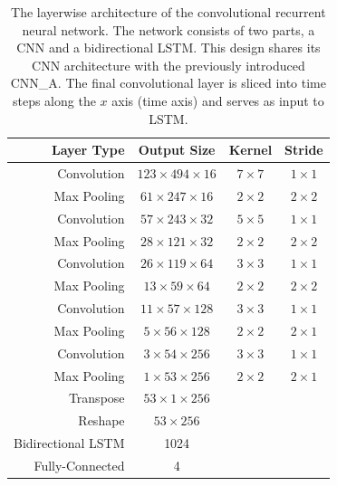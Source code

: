  \begin{table}[tp]
  \centering
  \begin{tabu}{rccc}
  \toprule
\textbf{Layer Type}       & \textbf{Output Size}    & \textbf{Kernel} & \textbf{Stride}  \\ \midrule
Convolution               & $123 \times 494 \times 16$  & $7 \times 7$    & $1 \times 1$    \\
Max Pooling               & $61 \times 247 \times 16$   & $2 \times 2$    & $2 \times 2$    \\
Convolution               & $57 \times 243 \times 32$   & $5 \times 5$    & $1 \times 1$    \\
Max Pooling               & $28 \times 121 \times 32$   & $2 \times 2$    & $2 \times 2$    \\
Convolution               & $26 \times 119 \times 64$   & $3 \times 3$    & $1 \times 1$    \\
Max Pooling               & $13 \times 59 \times 64$    & $2 \times 2$    & $2 \times 2$    \\
Convolution               & $11 \times 57 \times 128$   & $3 \times 3$    & $1 \times 1$    \\
Max Pooling               & $5 \times 56 \times 128$    & $2 \times 2$    & $2 \times 1$    \\
Convolution               & $3 \times 54 \times 256$    & $3 \times 3$    & $1 \times 1$    \\
Max Pooling               & $1 \times 53 \times 256$    & $2 \times 2$    & $2 \times 1$    \\
Transpose                 & $53 \times 1 \times 256$    &        &         \\
Reshape                   & $53 \times 256$           &        &         \\
Bidirectional LSTM & 1024                    &        &         \\
Fully-Connected    & 4                       &        &         \\
  \bottomrule
  \end{tabu}
  \caption{The layerwise architecture of the convolutional recurrent neural network. The network consists of two parts, a CNN and a bidirectional LSTM. This design shares its CNN architecture with the previously introduced CNN\_A. The final convolutional layer is sliced into time steps along the $x$ axis (time axis) and serves as input to LSTM.}
  \label{tab:layers_CRNN}
 \end{table}

